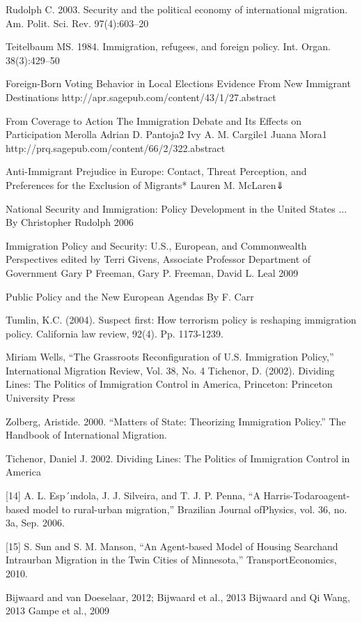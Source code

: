 
Rudolph C. 2003. Security and the political
economy of international migration. Am.
Polit. Sci. Rev. 97(4):603–20

Teitelbaum MS. 1984. Immigration, refugees,
and foreign policy. Int. Organ. 38(3):429–50

Foreign-Born Voting Behavior in Local Elections
Evidence From New Immigrant Destinations
http://apr.sagepub.com/content/43/1/27.abstract

From Coverage to Action
The Immigration Debate and Its Effects on Participation
Merolla
Adrian D. Pantoja2
Ivy A. M. Cargile1
Juana Mora1
http://prq.sagepub.com/content/66/2/322.abstract

Anti-Immigrant Prejudice in Europe: Contact, Threat Perception, and Preferences for the Exclusion of Migrants*
Lauren M. McLaren⇓

National Security and Immigration: Policy Development in the United States ...
By Christopher Rudolph
2006

Immigration Policy and Security: U.S., European, and Commonwealth Perspectives
edited by Terri Givens, Associate Professor Department of Government Gary P Freeman, Gary P. Freeman, David L. Leal
2009

Public Policy and the New European Agendas
By F. Carr

Tumlin, K.C. (2004). Suspect first: How terrorism policy is reshaping immigration policy. California law review, 92(4). Pp. 1173-1239.

Miriam Wells, “The Grassroots Reconfiguration of U.S. Immigration Policy,” International Migration Review, Vol. 38, No. 4
Tichenor, D. (2002). Dividing Lines: The Politics of Immigration Control in America, Princeton: Princeton University Press

Zolberg, Aristide. 2000. “Matters of State:  Theorizing Immigration Policy.”  The Handbook of International Migration.

Tichenor, Daniel J. 2002. Dividing Lines:  The Politics of Immigration Control in America

[14] A. L. Esp´ındola, J. J. Silveira, and T. J. P. Penna, “A Harris-Todaroagent-based model to rural-urban migration,” Brazilian Journal ofPhysics, vol. 36, no. 3a, Sep. 2006.

[15] S. Sun and S. M. Manson, “An Agent-based Model of Housing Searchand Intraurban Migration in the Twin Cities of Minnesota,” TransportEconomics, 2010.	

Bijwaard and van Doeselaar, 2012; 
Bijwaard et al., 2013
Bijwaard and Qi Wang, 2013
Gampe et al., 2009